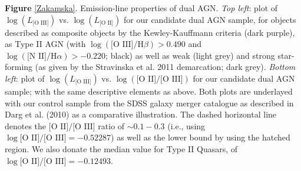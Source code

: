 \label{Zakamska} \textbf{Figure} \ref{Zakamska}. Emission-line properties of dual AGN. \textit{Top left}: plot of $\log{(L_{\text{[O III]}})}$ vs. $\log{(L_{\text{[O II]}})}$ for our candidate dual AGN sample, for objects described as composite objects by the Kewley-Kauffmann criteria (dark purple), as Type II AGN (with $\log(\text{[O III]}/\text{H}\beta)>{0.490}$ and $\log(\text{[N II]}/\text{H}\alpha)>{-0.220}$; black) as well as weak (light grey) and strong star-forming (as given by the Stravinska et al. 2011 demarcation; dark grey). \textit{Bottom left}: plot of $\log{(L_{\text{[O III]}})}$ vs. $\log{(\text{[O II]/[O III]})}$ for our candidate dual AGN sample; with the same descriptive elements as above. Both plots are underlayed with our control sample from the SDSS galaxy merger catalogue as described in Darg et al. (2010) as a comparative illustration. The dashed horizontal line denotes the \cite{Ferland_1986} $\text{[O II]/[O III]}$ ratio of $\sim{0.1-0.3}$ (i.e., using $\log{\text{[O II]/[O III]}}=-0.52287$) as well as the lower bound by using the hatched region. We also donate the \cite{Zakamska2003} median value for Type II Quasars, of $\log{\text{[O II]/[O III]}}=-0.12493$.